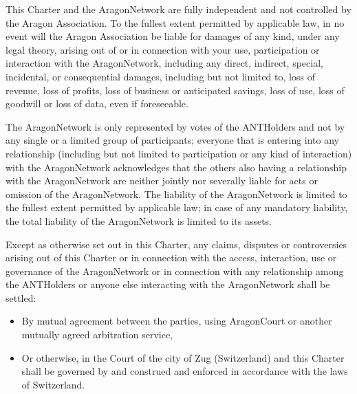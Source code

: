 \begin{enumerate}
	This Charter and the \gls{AragonNetwork} are fully independent and not controlled by the Aragon Association. To the fullest extent permitted by applicable law, in no event will the Aragon Association be liable for damages of any kind, under any legal theory, arising out of or in connection with your use, participation or interaction with the \gls{AragonNetwork}, including any direct, indirect, special, incidental, or consequential damages, including but not limited to, loss of revenue, loss of profits, loss of business or anticipated savings, loss of use, loss of goodwill or loss of data, even if foreseeable.
	
	The \gls{AragonNetwork} is only represented by votes of the \glspl{ANTHolder} and not by any single or a limited group of participants; 
	everyone that is entering into any relationship (including but not limited to participation or any kind of interaction) with the \gls{AragonNetwork} acknowledges that the others also having a relationship with the \gls{AragonNetwork} are neither jointly nor severally liable for acts or omission of the \gls{AragonNetwork}. 
	The liability of the \gls{AragonNetwork} is limited to the fullest extent permitted by applicable law; in case of any mandatory liability, the total liability of the \gls{AragonNetwork} is limited to its assets.
	
	Except as otherwise set out in this Charter, any claims, disputes or controversies arising out of this Charter or in connection with the access, interaction, use or governance of the \gls{AragonNetwork} or in connection with any relationship among the \glspl{ANTHolder} or anyone else interacting with the \gls{AragonNetwork} shall be settled:
	\begin{itemize}
		\item By mutual agreement between the parties, using \gls{AragonCourt} or another mutually agreed arbitration service,
		\item Or otherwise, in the Court of the city of Zug (Switzerland) and this Charter shall be governed by and construed and enforced in accordance with the laws of Switzerland.
	\end{itemize}
\end{enumerate}


